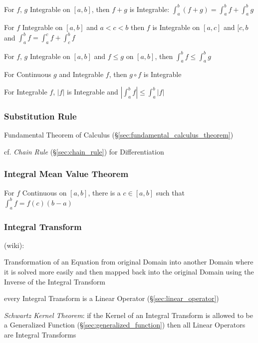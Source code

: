 For $f$, $g$ Integrable on $[a,b]$, then $f + g$ is Integrable:
$\int_a^b (f+g) = \int_a^b f + \int_a^b g$

For $f$ Integrable on $[a,b]$ and $a < c < b$ then $f$ is Integrable
on $[a,c]$ and $[c,b$ and $\int_a^b f = \int_a^c f + \int_c^b f$

For $f$, $g$ Integrable on $[a,b]$ and $f \leq g$ on $[a,b]$, then
$\int_a^b f \leq \int_a^b g$

For Continuous $g$ and Integrable $f$, then $g \circ f$ is Integrable

For Integrable $f$, $|f|$ is Integrable and $|\int_a^b f| \leq
\int_a^b |f|$



\subsubsection{Substitution Rule}\label{sec:substitution_rule}

Fundamental Theorem of Calculus (\S\ref{sec:fundamental_calculus_theorem})

\fist cf. \emph{Chain Rule} (\S\ref{sec:chain_rule}) for Differentiation



\subsubsection{Integral Mean Value Theorem}
\label{sec:integral_mean_value}

For $f$ Continuous on $[a,b]$, there is a $c \in [a,b]$ such that
$\int_a^b f = f(c)(b - a)$



\subsubsection{Integral Transform}\label{sec:integral_transform}

(wiki):

Transformation of an Equation from original Domain into another Domain where it
is solved more easily and then mapped back into the original Domain using the
Inverse of the Integral Transform

every Integral Transform is a Linear Operator (\S\ref{sec:linear_operator})

\emph{Schwartz Kernel Theorem}: if the Kernel of an Integral Transform is
allowed to be a Generalized Function (\S\ref{sec:generalized_function}) then
all Linear Operators are Integral Transforms

